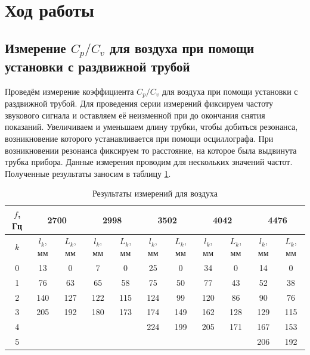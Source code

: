 \documentclass[a4paper,12pt]{article} %
\begin{document}
\section{Ход работы}

\subsection{Измерение $ C_p/C_v $ для воздуха при помощи установки с раздвижной трубой}

\label{ident}

Проведём измерение коэффициента $ C_p/C_v $ для воздуха при помощи установки с раздвижной трубой. Для проведения серии измерений фиксируем частоту звукового сигнала и оставляем её неизменной при до окончания снятия показаний. Увеличиваем и уменьшаем длину трубки, чтобы добиться резонанса, возникновение которого устанавливается при помощи осциллографа. При возникновении резонанса фиксируем то расстояние, на которое была выдвинута трубка прибора. Данные измерения проводим для нескольких значений частот. Полученные результаты заносим в таблицу \ref{tab:oxy}.

\begin{table}[H]
	\centering
	\begin{tabular}{|c|c|c|c|c|c|c|c|c|c|c|}
		\hline
		$ f $, Гц & \multicolumn{2}{c|}{\textbf{2700}} & \multicolumn{2}{c|}{\textbf{2998}} & \multicolumn{2}{c|}{\textbf{3502}} & \multicolumn{2}{c|}{\textbf{4042}} & \multicolumn{2}{c|}{\textbf{4476}} \\ \hline
		$ k $ & $ l_k $, мм & $ L_k $, мм & $ l_k $, мм & $ L_k $, мм & $ l_k $, мм & $ L_k $, мм & $ l_k $, мм & $ L_k $, мм & $ l_k $, мм & $ L_k $, мм \\ \hline
		0 & 13 & 0 & 7 & 0 & 25 & 0 & 34 & 0 & 14 & 0 \\ \hline
		1 & 76 & 63 & 65 & 58 & 75 & 50 & 77 & 43 & 52 & 38 \\ \hline
		2 & 140 & 127 & 122 & 115 & 124 & 99 & 120 & 86 & 90 & 76 \\ \hline
		3 & 205 & 192 & 180 & 173 & 174 & 149 & 162 & 128 & 129 & 115 \\ \hline
		4 &  &  &  &  & 224 & 199 & 205 & 171 & 167 & 153 \\ \hline
		5 &  &  &  &  &  &  &  &  & 206 & 192 \\ \hline
	\end{tabular}
	\caption{Результаты измерений для воздуха}
	\label{tab:oxy}
\end{table}
\end{document}
